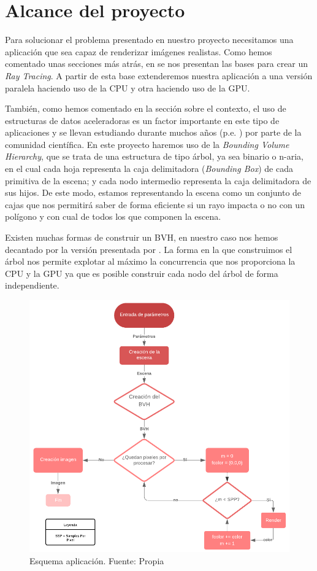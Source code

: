 \documentclass[titlepage,12pt]{report}
\begin{document}
\section{Alcance del proyecto}

Para solucionar el problema presentado en nuestro proyecto necesitamos una aplicación que sea capaz de renderizar imágenes realistas. Como hemos comentado unas secciones más atrás, en \citep{ShirleyRTA, ShirleyRTB, ShirleyRTC} se nos presentan las bases para crear un \textit{Ray Tracing}. A partir de esta base extenderemos nuestra aplicación a una versión paralela haciendo uso de la CPU y otra haciendo uso de la GPU.

También, como hemos comentado en la sección sobre el contexto, el uso de estructuras de datos aceleradoras es un factor importante en este tipo de aplicaciones y se llevan estudiando durante muchos años (p.e. \citep{Rubin1980}) por parte de la comunidad científica. En este proyecto haremos uso de la \textit{Bounding Volume Hierarchy}, que se trata de una estructura de tipo árbol, ya sea binario o n-aria, en el cual cada hoja representa la caja delimitadora (\textit{Bounding Box}) de cada primitiva de la escena; y cada nodo intermedio representa la caja delimitadora de sus hijos. De este modo, estamos representando la escena como un conjunto de cajas que nos permitirá saber de forma eficiente si un rayo impacta o no con un polígono y con cual de todos los que componen la escena.

Existen muchas formas de construir un BVH, en nuestro caso nos hemos decantado por la versión presentada por \citep{Karras2012, Karras2013}. La forma en la que construimos el árbol nos permite explotar al máximo la concurrencia que nos proporciona la CPU y la GPU ya que es posible construir cada nodo del árbol de forma independiente.

\begin{figure}[ht]
	\centering
	\includegraphics[scale=0.35]{media/Esquema.png}
	\caption{Esquema aplicación. Fuente: Propia}
	\label{Esquema}
\end{figure}
\end{document}
